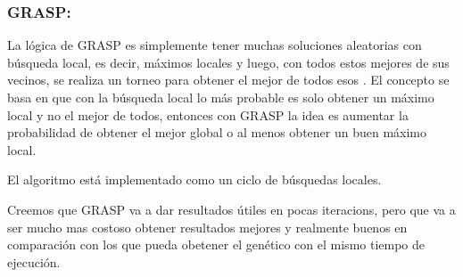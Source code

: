 \subsubsection{GRASP:}


La lógica de GRASP es simplemente tener muchas soluciones aleatorias con
búsqueda local, es decir, máximos locales y luego, con todos estos mejores de
sus vecinos, se realiza un torneo para obtener el mejor de todos esos . El
concepto se basa en que con la búsqueda local lo más probable es solo obtener un
máximo local y no el mejor de todos, entonces con GRASP la idea es aumentar la
probabilidad de obtener el mejor global o al menos obtener un buen máximo local.

El algoritmo está implementado como un ciclo de búsquedas locales.

Creemos que GRASP va a dar resultados útiles en pocas iteracions, pero que va a
ser mucho mas costoso obtener resultados mejores y realmente buenos en
comparación con los que pueda obetener el genético con el mismo tiempo de
ejecución.


